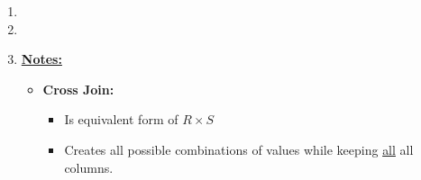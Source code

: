 \documentclass[12pt]{article}
\begin{document}
\begin{enumerate}[1.]
\begin{enumerate}[a)]
    \end{enumerate}

    \item

    \item

    \item

    \bigskip

    \underline{\textbf{Notes:}}

    \bigskip

    \begin{itemize}
        \item \textbf{Cross Join:}
        \begin{itemize}
            \item Is equivalent form of $R \times S$
            \item Creates all possible combinations of values while keeping \underline{all}
            all columns.
        \end{itemize}
    \end{itemize}
\end{enumerate}
\end{document}
